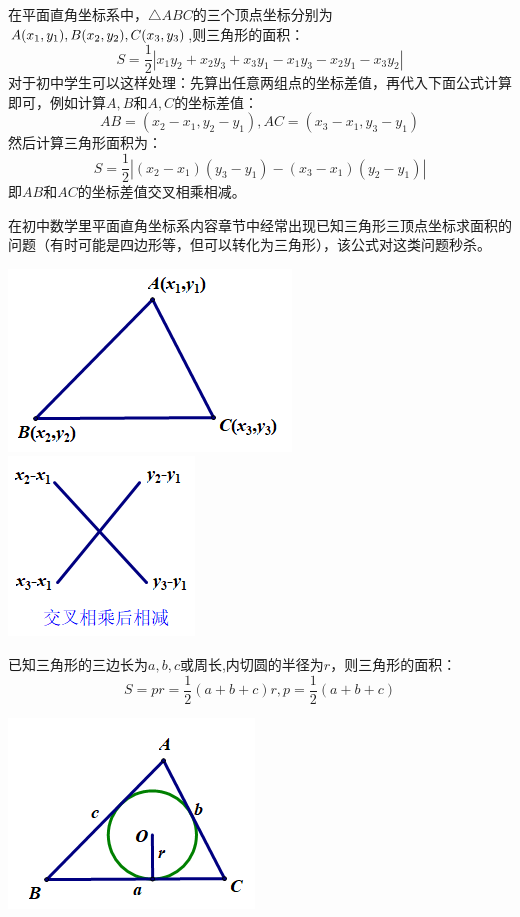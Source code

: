 \documentclass[10pt]{ctexart}
\begin{document}
\begin{minipage}[t]{0.7\textwidth}
\begin{dkyi}{}{}
在平面直角坐标系中，$\triangle ABC$的三个顶点坐标分别为$A(x_1,y_1),\\B(x_2,y_2),C(x_3,y_3)$,则三角形的面积：
\[S=\dfrac{1}{2}\left|x_1y_2+x_2y_3+x_3y_1-x_1y_3-x_2y_1-x_3y_2\right|\]
对于初中学生可以这样处理：先算出任意两组点的坐标差值，再代入下面公式计算即可，例如计算$A,B$和$A,C$的坐标差值：
\[AB=(x_2-x_1,y_2-y_1),AC=(x_3-x_1,y_3-y_1)\]
然后计算三角形面积为：
\[S=\dfrac{1}{2}\left|(x_2-x_1)(y_3-y_1)-(x_3-x_1)(y_2-y_1)\right|\]即$AB$和$AC$的坐标差值交叉相乘相减。

在初中数学里平面直角坐标系内容章节中经常出现已知三角形三顶点坐标求面积的问题（有时可能是四边形等，但可以转化为三角形），该公式对这类问题秒杀。
\end{dkyi}
\end{minipage}
\begin{minipage}[b]{0.3\textwidth}
\includegraphics[scale=0.6]{figure/mj-04.png}\\
\includegraphics[scale=0.6]{figure/mj-shizi.png}
\end{minipage}

\begin{minipage}[t]{0.7\textwidth}
\begin{dkyi}{}{}
已知三角形的三边长为$a,b,c$或周长,内切圆的半径为$r$，则三角形的面积：
\[S=pr=\dfrac{1}{2}(a+b+c)r,p=\dfrac{1}{2}(a+b+c)\]
\end{dkyi}
\end{minipage}
\begin{minipage}[t]{0.3\textwidth}
\includegraphics[scale=0.6]{figure/mj-05.png}
\end{minipage}
\end{document}
